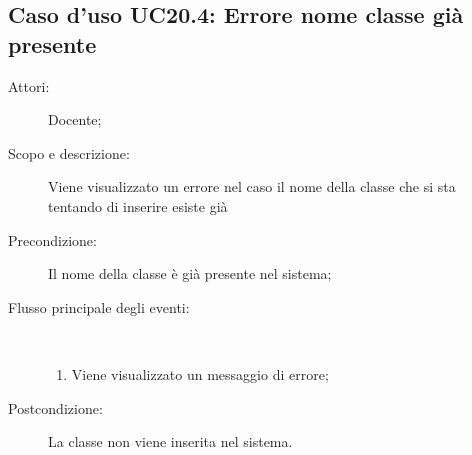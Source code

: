 \subsection{Caso d'uso UC20.4: Errore nome classe già presente}\begin{description}
	\item[Attori:] Docente;
	\item[Scopo e descrizione:] Viene visualizzato un errore nel caso il nome della classe che si sta tentando di inserire esiste già
	\item[Precondizione:] Il nome della classe è già presente nel sistema;
	
	\item[Flusso principale degli eventi:] \ 
	\begin{enumerate}
		\item Viene visualizzato un messaggio di errore;
		
	\end{enumerate}
	\item[Postcondizione:] La classe non viene inserita nel sistema.
\end{description}
\hypertarget{UC21}{}
